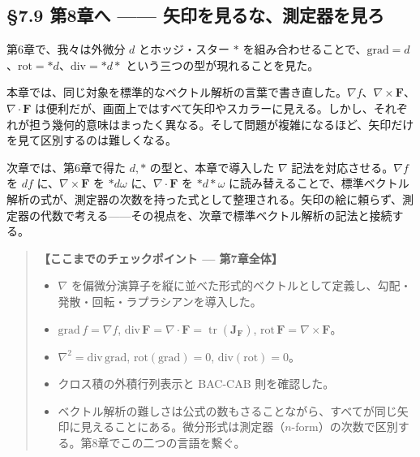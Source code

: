 \documentclass[a4paper,12pt,openany]{book}
\begin{document}
\par\vspace{0.35em}\par

\hypertarget{ux7b2c8ux7ae0ux3078-ux77e2ux5370ux3092ux898bux308bux306aux6e2cux5b9aux5668ux3092ux898bux308d}{%
\subsection{§7.9 第8章へ ——
矢印を見るな、測定器を見ろ}\label{ux7b2c8ux7ae0ux3078-ux77e2ux5370ux3092ux898bux308bux306aux6e2cux5b9aux5668ux3092ux898bux308d}}

第6章で、我々は外微分 \(d\) とホッジ・スター \(\ast\)
を組み合わせることで、\(\mathrm{grad}=d\)、\(\mathrm{rot}=\ast d\)、\(\mathrm{div}=\ast d\ast\)
という三つの型が現れることを見た。

本章では、同じ対象を標準的なベクトル解析の言葉で書き直した。\(\nabla f\)、\(\nabla\times\mathbf F\)、\(\nabla\cdot\mathbf F\)
は便利だが、画面上ではすべて矢印やスカラーに見える。しかし、それぞれが担う幾何的意味はまったく異なる。そして問題が複雑になるほど、矢印だけを見て区別するのは難しくなる。

次章では、第6章で得た \(d,\ast\) の型と、本章で導入した \(\nabla\)
記法を対応させる。\(\nabla f\) を \(df\) に、\(\nabla\times\mathbf F\)
を \(\ast d\omega\) に、\(\nabla\cdot\mathbf F\) を \(\ast d\ast\omega\)
に読み替えることで、標準ベクトル解析の式が、測定器の次数を持った式として整理される。矢印の絵に頼らず、測定器の代数で考える——その視点を、次章で標準ベクトル解析の記法と接続する。

\begin{quote}
\textbf{【ここまでのチェックポイント — 第7章全体】}

\begin{itemize}
\item
  \(\nabla\)
  を偏微分演算子を縦に並べた形式的ベクトルとして定義し、勾配・発散・回転・ラプラシアンを導入した。
\item
  \(\mathrm{grad}\,f = \nabla f\),
  \(\mathrm{div}\,\mathbf{F} = \nabla \cdot \mathbf{F} = \operatorname{tr}(\mathbf{J}_\mathbf{F})\),
  \(\mathrm{rot}\,\mathbf{F} = \nabla \times \mathbf{F}\)。
\item
  \(\nabla^2 = \mathrm{div}\,\mathrm{grad}\),
  \(\mathrm{rot}(\mathrm{grad}) = 0\),
  \(\mathrm{div}(\mathrm{rot}) = 0\)。
\item
  クロス積の外積行列表示と BAC-CAB 則を確認した。
\item
  ベクトル解析の難しさは公式の数もさることながら、すべてが同じ矢印に見えることにある。微分形式は測定器（\(n\)-form）の次数で区別する。第8章でこの二つの言語を繫ぐ。
\end{itemize}
\end{quote}
\end{document}
